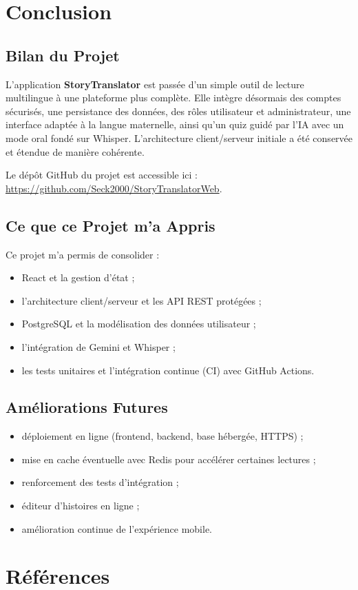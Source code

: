\documentclass[12pt,twoside,letterpaper]{article}
\begin{document}
\newpage

\section{Conclusion}

\subsection{Bilan du Projet}

L'application \textbf{StoryTranslator} est pass\'ee d'un simple outil de lecture multilingue
\`a une plateforme plus compl\`ete.
Elle int\`egre d\'esormais des comptes s\'ecuris\'es, une persistance des donn\'ees,
des r\^oles utilisateur et administrateur, une interface adapt\'ee \`a la langue maternelle,
ainsi qu'un quiz guid\'e par l'IA avec un mode oral fond\'e sur Whisper.
L'architecture client/serveur initiale a \'et\'e conserv\'ee et \'etendue de mani\`ere coh\'erente.

Le d\'ep\^ot GitHub du projet est accessible ici :
\url{https://github.com/Seck2000/StoryTranslatorWeb}.

\subsection{Ce que ce Projet m'a Appris}

Ce projet m'a permis de consolider :
\begin{itemize}[leftmargin=*]
  \item React et la gestion d'\'etat ;
  \item l'architecture client/serveur et les API REST prot\'eg\'ees ;
  \item PostgreSQL et la mod\'elisation des donn\'ees utilisateur ;
  \item l'int\'egration de Gemini et Whisper ;
  \item les tests unitaires et l'int\'egration continue (CI) avec GitHub Actions.
\end{itemize}

\subsection{Am\'eliorations Futures}

\begin{itemize}[leftmargin=*]
  \item d\'eploiement en ligne (frontend, backend, base h\'eberg\'ee, HTTPS) ;
  \item mise en cache \'eventuelle avec Redis pour acc\'el\'erer certaines lectures ;
  \item renforcement des tests d'int\'egration ;
  \item \'editeur d'histoires en ligne ;
  \item am\'elioration continue de l'exp\'erience mobile.
\end{itemize}

\newpage
\section*{R\'ef\'erences}
\nocite{*}

\end{document}

